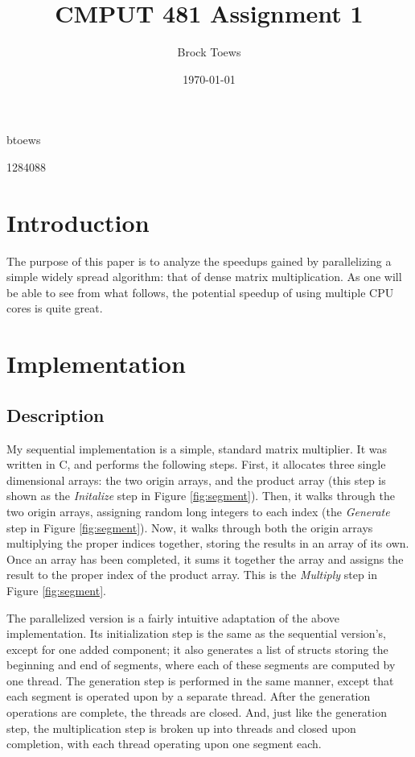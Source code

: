 \documentclass[11pt]{article}
\title{CMPUT 481 Assignment 1}
\author{Brock Toews}
\date{\today}
\begin{document}
\maketitle
\begin{center}
btoews

1284088
\end{center}
\thispagestyle{empty}
\pagebreak
\setcounter{page}{1}
\listoffigures
\tableofcontents
\pagebreak
\section{Introduction}
The purpose of this paper is to analyze the speedups gained by parallelizing a
simple widely spread algorithm: that of dense matrix multiplication. As one
will be able to see from what follows, the potential speedup of using multiple
CPU cores is quite great.
\section{Implementation}
\subsection{Description}
My sequential implementation is a simple, standard matrix multiplier. It was
written in C, and performs the following steps. First, it allocates three
single dimensional arrays: the two origin arrays, and the product array (this
step is shown as the \emph{Initalize} step in Figure \ref{fig:segment}). Then,
it walks through the two origin arrays, assigning random long integers to each
index (the \emph{Generate} step in Figure \ref{fig:segment}). Now, it walks
through both the origin arrays multiplying the proper indices together, storing
the results in an array of its own. Once an array has been completed, it sums
it together the array and assigns the result to the proper index of the product
array. This is the \emph{Multiply} step in Figure \ref{fig:segment}.

The parallelized version is a fairly intuitive adaptation of the above
implementation. Its initialization step is the same as the sequential
version's, except for one added component; it also generates a list of structs
storing the beginning and end of segments, where each of these segments are
computed by one thread. The generation step is performed in the same manner,
except that each segment is operated upon by a separate thread. After the
generation operations are complete, the threads are closed. And, just like
the generation step, the multiplication step is broken up into threads and
closed upon completion, with each thread operating upon one segment each.
\end{document}
